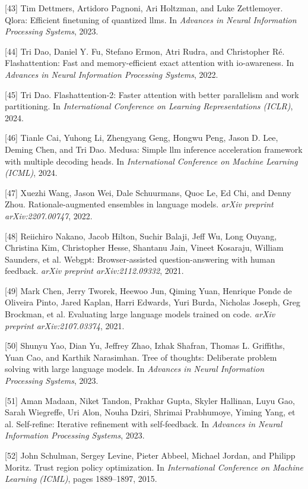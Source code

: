 \documentclass{article}
\begin{document}
[43] Tim Dettmers, Artidoro Pagnoni, Ari Holtzman, and Luke
Zettlemoyer. Qlora: Efficient finetuning of quantized llms. In
\textit{Advances in Neural Information Processing Systems},
2023.

[44] Tri Dao, Daniel Y. Fu, Stefano Ermon, Atri Rudra, and
Christopher R\'e. Flashattention: Fast and memory-efficient exact
attention with io-awareness. In \textit{Advances in Neural
Information Processing Systems}, 2022.

[45] Tri Dao. Flashattention-2: Faster attention with better
parallelism and work partitioning. In \textit{International
Conference on Learning Representations (ICLR)}, 2024.

[46] Tianle Cai, Yuhong Li, Zhengyang Geng, Hongwu Peng, Jason D.
Lee, Deming Chen, and Tri Dao. Medusa: Simple llm inference
acceleration framework with multiple decoding heads. In
\textit{International Conference on Machine Learning (ICML)},
2024.

[47] Xuezhi Wang, Jason Wei, Dale Schuurmans, Quoc Le, Ed Chi,
and Denny Zhou. Rationale-augmented ensembles in language
models. \textit{arXiv preprint arXiv:2207.00747}, 2022.

[48] Reiichiro Nakano, Jacob Hilton, Suchir Balaji, Jeff Wu,
Long Ouyang, Christina Kim, Christopher Hesse, Shantanu Jain,
Vineet Kosaraju, William Saunders, et al. Webgpt: Browser-assisted
question-answering with human feedback.
\textit{arXiv preprint arXiv:2112.09332}, 2021.

[49] Mark Chen, Jerry Tworek, Heewoo Jun, Qiming Yuan, Henrique
Ponde de Oliveira Pinto, Jared Kaplan, Harri Edwards, Yuri Burda,
Nicholas Joseph, Greg Brockman, et al. Evaluating large language
models trained on code.
\textit{arXiv preprint arXiv:2107.03374}, 2021.

[50] Shunyu Yao, Dian Yu, Jeffrey Zhao, Izhak Shafran, Thomas L.
Griffiths, Yuan Cao, and Karthik Narasimhan. Tree of thoughts:
Deliberate problem solving with large language models. In
\textit{Advances in Neural Information Processing Systems},
2023.

[51] Aman Madaan, Niket Tandon, Prakhar Gupta, Skyler Hallinan,
Luyu Gao, Sarah Wiegreffe, Uri Alon, Nouha Dziri, Shrimai
Prabhumoye, Yiming Yang, et al. Self-refine: Iterative refinement
with self-feedback. In \textit{Advances in Neural Information
Processing Systems}, 2023.

[52] John Schulman, Sergey Levine, Pieter Abbeel, Michael Jordan,
and Philipp Moritz. Trust region policy optimization. In
\textit{International Conference on Machine Learning (ICML)},
pages 1889--1897, 2015.
\end{document}
